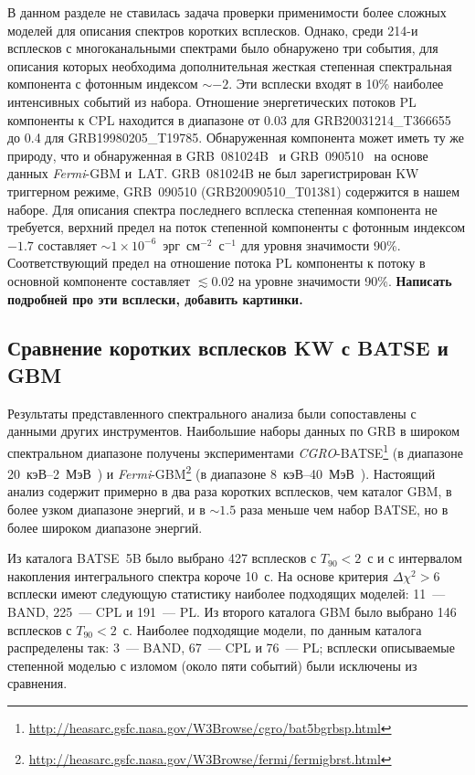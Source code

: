В данном разделе не ставилась задача проверки применимости более сложных моделей
для описания спектров коротких всплесков.
Однако, среди 214-и всплесков с многоканальными спектрами было обнаружено три
события, для описания которых необходима дополнительная жесткая степенная 
спектральная компонента с фотонным индексом $\sim -2$. Эти всплески входят в 10\%
наиболее интенсивных событий из набора. Отношение энергетических потоков PL
компоненты к CPL находится в диапазоне от 0.03 для GRB20031214\_T366655 до
0.4 для GRB19980205\_T19785. Обнаруженная компонента может иметь ту же природу,
что и обнаруженная в GRB~081024B~\citep{Abdo_2010ApJ_712_558A} и 
GRB~090510~\citep{Ackermann_2010ApJ_716_1178A} на основе данных \textit{Fermi}-GBM и~LAT.
GRB~081024B не был зарегистрирован KW триггерном режиме, GRB~090510 (GRB20090510\_T01381)
содержится в нашем наборе. Для описания спектра последнего всплеска степенная 
компонента не требуется, верхний предел на поток степенной компоненты с фотонным 
индексом $-1.7$ составляет $\sim 1 \times 10^{-6}$~эрг~см$^{-2}$~с$^{-1}$ для 
уровня значимости 90\%. Соответствующий предел на отношение потока PL компоненты 
к потоку в основной компоненте составляет $\lesssim 0.02$ на уровне значимости 90\%.
\textbf{Написать подробней про эти всплески, добавить картинки.}

\subsection{Сравнение коротких всплесков KW с BATSE и GBM}
Результаты представленного спектрального анализа были сопоставлены с данными
других инструментов.
Наибольшие наборы данных по GRB в широком спектральном диапазоне получены экспериментами
\textit{CGRO}-BATSE\footnote{\url{http://heasarc.gsfc.nasa.gov/W3Browse/cgro/bat5bgrbsp.html}}
(в диапазоне 20~кэВ--2~МэВ~\citep{Goldstein_2013ApJS}) и 
\textit{Fermi}-GBM\footnote{\url{http://heasarc.gsfc.nasa.gov/W3Browse/fermi/fermigbrst.html}}
(в диапазоне 8~кэВ--40~МэВ~\citep{Gruber_2014ApJS}). 
Настоящий анализ содержит примерно в два раза коротких всплесков, чем каталог GBM, 
в более узком диапазоне энергий, и в $\sim 1.5 $ раза меньше чем набор BATSE, 
но в более широком диапазоне энергий.

Из каталога BATSE~5B было выбрано 427 всплесков с $T_{90}<2$~с и с интервалом 
накопления интегрального спектра короче 10~с. На основе критерия $\Delta \chi^2>6$
всплески имеют следующую статистику наиболее подходящих моделей:
11~--- BAND, 225~--- CPL и 191~--- PL.
Из второго каталога GBM было выбрано 146 всплесков с $T_{90}<2$~с. Наиболее подходящие модели,
по данным каталога распределены так: 3~--- BAND, 67~--- CPL и 76~--- PL;
всплески описываемые степенной моделью с изломом (около пяти событий) были 
исключены из сравнения.

